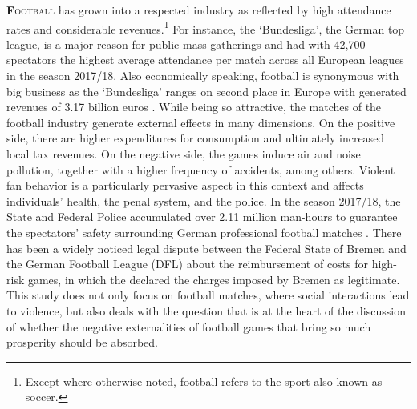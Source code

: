 
\lettrine[lines=2,nindent=0pt]{\color{darkgray}\textbf{F}}{ootball} has grown into a respected industry as reflected by high attendance rates and considerable revenues.\footnote{Except where otherwise noted, football refers to the sport also known as soccer.} For instance, the `Bundesliga', the German top league, is a major reason for public mass gatherings and had with 42,700 spectators the highest average attendance per match across all European leagues in the season 2017/18. Also economically speaking, football is synonymous with big business as the `Bundesliga' ranges on second place in Europe with generated revenues of 3.17 billion euros \citep{deloitte2019report}. While being so attractive, the matches of the football industry generate external effects in many dimensions. On the positive side, there are higher expenditures for consumption and ultimately increased local tax revenues. On the negative side, the games induce air and noise pollution, together with a higher frequency of accidents, among others. Violent fan behavior is a particularly pervasive aspect in this context and affects individuals' health, the penal system, and the police. In the season 2017/18, the State and Federal Police accumulated over 2.11 million man-hours to guarantee the spectators' safety surrounding German professional football matches \citep{zis17_18}. There has been a widely noticed legal dispute between the Federal State of Bremen and the German Football League (DFL) about the reimbursement of costs for high-risk games, in which the \cite{fac_2019} declared the charges imposed by Bremen as legitimate. This study does not only focus on football matches, where social interactions lead to violence, but also deals with the question that is at the heart of the discussion of whether the negative externalities of football games that bring so much prosperity should be absorbed. 




